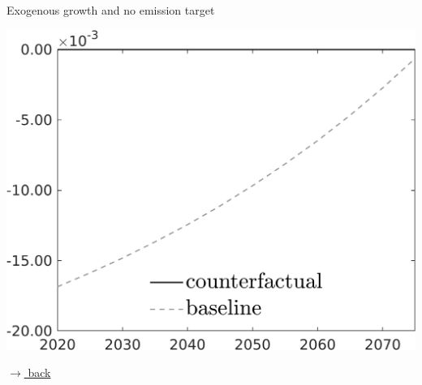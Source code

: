\documentclass[11pt,aspectratio=169]{beamer}
\begin{document}
\begin{frame}{Exogenous growth and no emission target}
	\centering 
	\begin{minipage}[]{0.4\textwidth}
		\includegraphics[width=1\textwidth]{../codding_model/own_basedOnFried/optimalPol_elastS_DisuSci/figures/all_1705/SingleROB_xgrowth_OPT_NOT_NoTaus_taul_spillover0_noskill0_sep1_BN0_ineq0_red0_etaa0.79_lgd1.png}
	\end{minipage}
	
	\vspace{1mm}
	\hfill
	\hyperlink{conc}{\tiny{$\rightarrow$ back}}
\end{frame}
\end{document}

